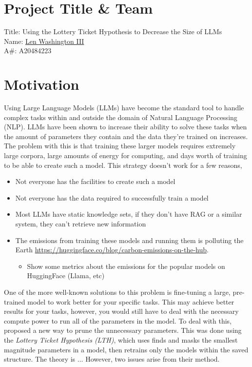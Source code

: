 \documentclass[
	title={Lottery Ticket Hypothesis}
]{cs595project}
\begin{document}
\section{Project Title \& Team}\label{sec:project-title-&-team}
Title: Using the Lottery Ticket Hypothesis to Decrease the Size of LLMs\\
Name: \href{mailto:lwashington3@hawk.illinoistech.edu}{Len Washington III}~\\
A\#: A20484223

\section{Motivation}\label{sec:problem-&-motivation}
Using Large Language Models (LLMs) have become the standard tool to handle complex tasks within and outside the domain of Natural Language Processing (NLP).
LLMs have been shown to increase their ability to solve these tasks when the amount of parameters they contain and the data they're trained on increases.
The problem with this is that training these larger models requires extremely large corpora, large amounts of energy for computing, and days worth of training to be able to create such a model.
This strategy doesn't work for a few reasons,
\begin{itemize}
	\item Not everyone has the facilities to create such a model
	\item Not everyone has the data required to successfully train a model
	\item Most LLMs have static knowledge sets, if they don't have RAG or a similar system, they can't retrieve new information
	\item The emissions from training these models and running them is polluting the Earth \url{https://huggingface.co/blog/carbon-emissions-on-the-hub}.
	\begin{itemize}
		\item Show some metrics about the emissions for the popular models on HuggingFace (Llama, etc)
	\end{itemize}
\end{itemize}

One of the more well-known solutions to this problem is fine-tuning a large, pre-trained model to work better for your specific tasks.
This may achieve better results for your tasks, however, you would still have to deal with the necessary compute power to run all of the parameters in the model.
To deal with this,~\citeauthor{Lottery-Ticket-Hypothesis} proposed a new way to prune the unnecessary parameters.
This was done using the \textit{Lottery Ticket Hypothesis (LTH)}, which uses finds and masks the smallest magnitude parameters in a model, then retrains only the models within the saved structure.
The theory is $\dots$
However, two issues arise from their method.
\end{document}

